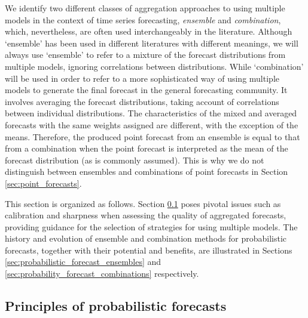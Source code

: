 \documentclass[11pt]{article}
\begin{document}
We identify two different classes of aggregation approaches to using multiple models in the context of time series forecasting, \textit{ensemble} and \textit{combination}, which, nevertheless, are often used interchangeably in the literature. Although `ensemble' has been used in different literatures with different meanings, we will always use `ensemble' to refer to a mixture of the forecast distributions from multiple models, ignoring correlations between distributions. While `combination' will be used in order to refer to a more sophisticated way of using multiple models to generate the final forecast in the general forecasting community. It involves averaging the forecast distributions, taking account of correlations between individual distributions. The characteristics of the mixed and averaged forecasts with the same weights assigned are different, with the exception of the means. Therefore, the produced point forecast from an ensemble is equal to that from a combination when the point forecast is interpreted as the mean of the forecast distribution (as is commonly assumed). This is why we do not distinguish between ensembles and combinations of point forecasts in Section \ref{sec:point_forecasts}.

This section is organized as follows. Section \ref{sec:principles_of_probabilistic_forecasts} poses pivotal issues such as calibration and sharpness when assessing the quality of aggregated forecasts, providing guidance for the selection of strategies for using multiple models. The history and evolution of ensemble and combination methods for probabilistic forecasts, together with their potential and benefits, are illustrated in Sections \ref{sec:probabilistic_forecast_ensembles} and \ref{sec:probability_forecast_combinations} respectively.

\subsection{Principles of probabilistic forecasts}
\label{sec:principles_of_probabilistic_forecasts}
\end{document}
